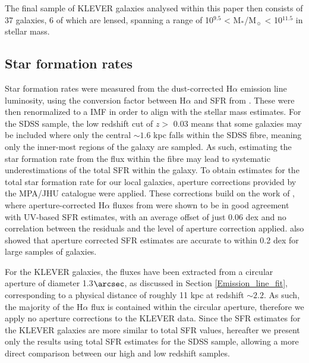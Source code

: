 \documentclass[usenatbib]{mnras} %
\begin{document}
The final sample of KLEVER galaxies analysed within this paper then consists of 37 galaxies, 6 of which are lensed, spanning a range of 10$^{9.5}$ < M$_*$/M$_{\sun}$ < 10$^{11.5}$ in stellar mass. 



\subsection{Star formation rates}\label{sec:SFR}

Star formation rates were measured from the dust-corrected H$\alpha$ emission line luminosity, using the conversion factor between H$\alpha$ and SFR from \cite{Kennicutt_2012}. These were then renormalized to a \cite{Chabrier_2003} IMF in order to align with the stellar mass estimates. For the SDSS sample, the low redshift cut of $z >$ 0.03 means that some galaxies may be included where only the central $\sim1.6$ kpc falls within the SDSS fibre, meaning only the inner-most regions of the galaxy are sampled. As such, estimating the star formation rate from the flux within the fibre may lead to systematic underestimations of the total SFR within the galaxy. To obtain estimates for the total star formation rate for our local galaxies, aperture corrections provided by the MPA/JHU catalogue were applied. These corrections build on the work of \cite{Salim_2007}, where aperture-corrected  H$\alpha$ fluxes from \cite{Brinchmann_2004} were shown to be in good agreement with UV-based SFR estimates, with an average offset of just 0.06 dex and no correlation between the residuals and the level of aperture correction applied. \cite{Richards_2016} also showed that aperture corrected SFR estimates are accurate to within 0.2 dex for large samples of galaxies.


For the KLEVER galaxies, the fluxes have been extracted from a circular aperture of diameter 1.3$\arcsec$, as discussed in Section \ref{Emission_line_fit}, corresponding to a physical distance of roughly 11 kpc at redshift $\sim 2.2$. As such, the majority of the H$\alpha$ flux is contained within the circular aperture, therefore we apply no aperture corrections to the KLEVER data. Since the SFR estimates for the KLEVER galaxies are more similar to total SFR values, hereafter we present only the results using total SFR estimates for the SDSS sample, allowing a more direct comparison between our high and low redshift samples.
\end{document}
